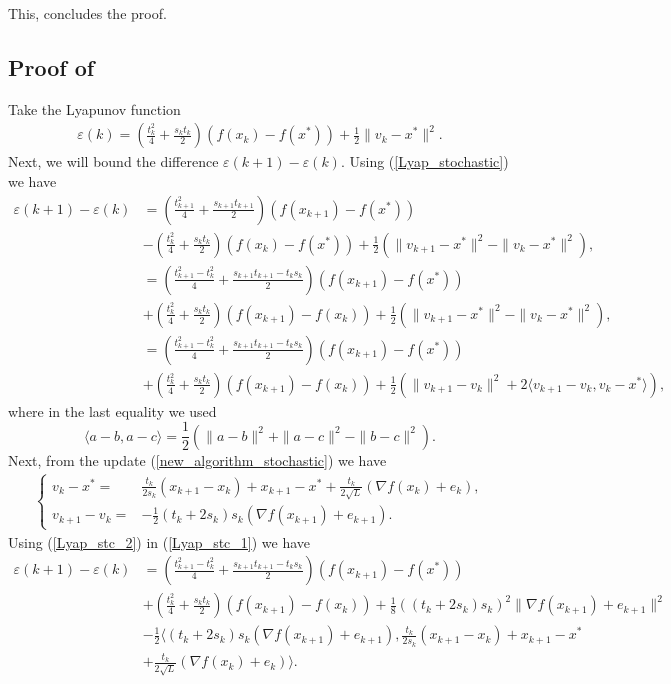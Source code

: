 \documentclass{article}
\theoremstyle{plain}
\theoremstyle{definition}
\theoremstyle{remark}
\begin{document}
This, concludes the proof.
\subsection{Proof of }\label{thm6_proof}
Take the Lyapunov function
    \begin{align}\label{Lyap_stochastic}
    \varepsilon(k)= (\frac{t_k^2}{4}+\frac{s_kt_k}{2})(f(x_k)-f(x^*))+\frac{1}{2}\|v_k-x^*\|^2.
    \end{align}
    Next, we will bound the difference $\varepsilon(k+1)-\varepsilon(k)$. Using (\ref{Lyap_stochastic}) we have
    \begin{align}\label{Lyap_stc_1}
        \varepsilon(k+1)-\varepsilon(k)&=(\frac{t_{k+1}^2}{4}+\frac{s_{k+1}t_{k+1}}{2})(f(x_{k+1})-f(x^*))\nonumber\\
        &-(\frac{t_{k}^2}{4}+\frac{s_{k}t_{k}}{2})(f(x_{k})-f(x^*))+\frac{1}{2}(\|v_{k+1}-x^*\|^2-\|v_{k}-x^*\|^2),\nonumber\\
        & = (\frac{t_{k+1}^2-t_k^2}{4}+\frac{s_{k+1}t_{k+1}-t_ks_k}{2})(f(x_{k+1})-f(x^*))\nonumber\\
        &+(\frac{t_{k}^2}{4}+\frac{s_{k}t_{k}}{2})(f(x_{k+1})-f(x_k))+\frac{1}{2}(\|v_{k+1}-x^*\|^2-\|v_{k}-x^*\|^2),\nonumber\\
        &= (\frac{t_{k+1}^2-t_k^2}{4}+\frac{s_{k+1}t_{k+1}-t_ks_k}{2})(f(x_{k+1})-f(x^*))\nonumber\\
        &+(\frac{t_{k}^2}{4}+\frac{s_{k}t_{k}}{2})(f(x_{k+1})-f(x_k))+\frac{1}{2}(\|v_{k+1}-v_k\|^2+2\langle v_{k+1}-v_k,v_k-x^*\rangle),
    \end{align}
    where in the last equality we used 
    $$\langle a-b,a-c\rangle = \frac{1}{2}(\|a-b\|^2+\|a-c\|^2-\|b-c\|^2).$$
    Next, from the update (\ref{new_algorithm_stochastic}) we have
    \begin{align}\label{Lyap_stc_2}
        \left\{\begin{array}{cl}
             v_k-x^*=&\frac{t_k}{2s_k}(x_{k+1}-x_k)+x_{k+1}-x^*+\frac{t_k}{2\sqrt{L}}(\nabla f(x_k)+e_k),  \\
            v_{k+1}-v_k=& -\frac{1}{2}(t_k+2s_k)s_k (\nabla f(x_{k+1})+e_{k+1}).
        \end{array}\right.
    \end{align}
    Using (\ref{Lyap_stc_2}) in (\ref{Lyap_stc_1}) we have
    \begin{align}\label{Lyap_stc_3}
        \varepsilon(k+1)-\varepsilon(k)&=(\frac{t_{k+1}^2-t_k^2}{4}+\frac{s_{k+1}t_{k+1}-t_ks_k}{2})(f(x_{k+1})-f(x^*))\nonumber\\
        &+(\frac{t_{k}^2}{4}+\frac{s_{k}t_{k}}{2})(f(x_{k+1})-f(x_k))+\frac{1}{8}((t_k+2s_k)s_k)^2\|\nabla f(x_{k+1})+e_{k+1}\|^2\nonumber\\
        &-\frac{1}{2}\langle (t_k+2s_k)s_k (\nabla f(x_{k+1})+e_{k+1}), \frac{t_k}{2s_k}(x_{k+1}-x_k)+x_{k+1}-x^*\nonumber\\
        &+\frac{t_k}{2\sqrt{L}}(\nabla f(x_k)+e_k)\rangle.
    \end{align}
\end{document}
